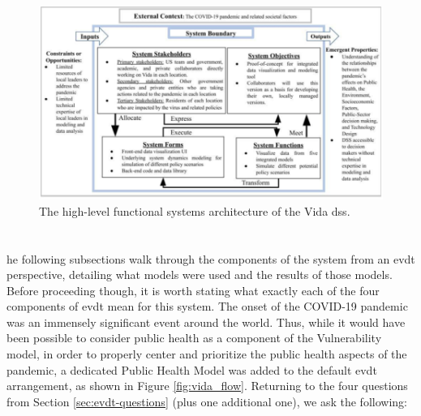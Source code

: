 \subsubsection{}

\subsubsection{}

\begin{figure}[H]
	\centering
	\includegraphics[scale=0.4]{Figures/chap5/architecture.png}
	\caption{The high-level functional systems architecture of the Vida \ac{dss}.}
	\label{fig:architecture}
\end{figure}

\subsubsection{}

\section{} \label{sec:vida-evdt}

he following subsections walk through the components of the system from an \acf{evdt} perspective, detailing what models were used and the results of those models. Before proceeding though, it is worth stating what exactly each of the four components of \ac{evdt} mean for this system. The onset of the COVID-19 pandemic was an immensely significant event around the world. Thus, while it would have been possible to consider public health as a component of the Vulnerability model, in order to properly center and prioritize the public health aspects of the pandemic, a dedicated Public Health Model was added to the default \ac{evdt} arrangement, as shown in Figure \ref{fig:vida_flow}. Returning to the four questions from Section \ref{sec:evdt-questions} (plus one additional one), we ask the following:

